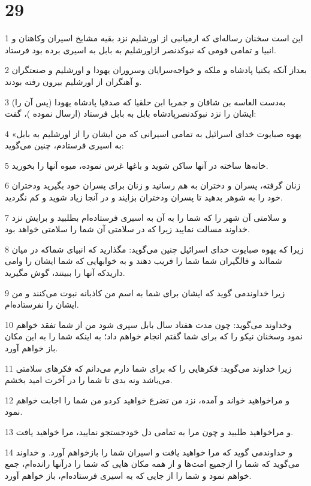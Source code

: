 \chapter{29}

\par 1 این است سخنان رساله‌ای که ارمیانبی از اورشلیم نزد بقیه مشایخ اسیران وکاهنان و انبیا و تمامی قومی که نبوکدنصر ازاورشلیم به بابل به اسیری برده بود فرستاد.
\par 2 بعداز آنکه یکنیا پادشاه و ملکه و خواجه‌سرایان وسروران یهودا و اورشلیم و صنعتگران و آهنگران از اورشلیم بیرون رفته بودند.
\par 3 (پس آن را) به‌دست العاسه بن شافان و جمریا ابن حلقیا که صدقیا پادشاه یهودا ایشان را نزد نبوکدنصرپادشاه بابل به بابل فرستاد (ارسال نموده )، گفت:
\par 4 «یهوه صبایوت خدای اسرائیل به تمامی اسیرانی که من ایشان را از اورشلیم به بابل به اسیری فرستادم، چنین می‌گوید:
\par 5 خانه‌ها ساخته در آنها ساکن شوید و باغها غرس نموده، میوه آنها را بخورید.
\par 6 زنان گرفته، پسران و دختران به هم رسانید و زنان برای پسران خود بگیرید ودختران خود را به شوهر بدهید تا پسران ودختران بزایند و در آنجا زیاد شوید و کم نگردید.
\par 7 و سلامتی آن شهر را که شما را به آن به اسیری فرستاده‌ام بطلبید و برایش نزد خداوند مسالت نمایید زیرا که در سلامتی آن شما را سلامتی خواهد بود.
\par 8 زیرا که یهوه صبایوت خدای اسرائیل چنین می‌گوید: مگذارید که انبیای شماکه در میان شمااند و فالگیران شما شما را فریب دهند و به خوابهایی که شما ایشان را وامی داریدکه آنها را ببینند، گوش مگیرید.
\par 9 زیرا خداوندمی گوید که ایشان برای شما به اسم من کاذبانه نبوت می‌کنند و من ایشان را نفرستاده‌ام.
\par 10 وخداوند می‌گوید: چون مدت هفتاد سال بابل سپری شود من از شما تفقد خواهم نمود وسخنان نیکو را که برای شما گفتم انجام خواهم داد؛ به اینکه شما را به این مکان باز خواهم آورد.
\par 11 زیرا خداوند می‌گوید: فکرهایی را که برای شما دارم می‌دانم که فکرهای سلامتی می‌باشد ونه بدی تا شما را در آخرت امید بخشم.
\par 12 و مراخواهید خواند و آمده، نزد من تضرع خواهید کردو من شما را اجابت خواهم نمود.
\par 13 و مراخواهید طلبید و چون مرا به تمامی دل خودجستجو نمایید، مرا خواهید یافت.
\par 14 و خداوندمی گوید که مرا خواهید یافت و اسیران شما را بازخواهم آورد. و خداوند می‌گوید که شما را ازجمیع امت‌ها و از همه مکان هایی که شما را درآنها رانده‌ام، جمع خواهم نمود و شما را از جایی که به اسیری فرستاده‌ام، باز خواهم آورد.
